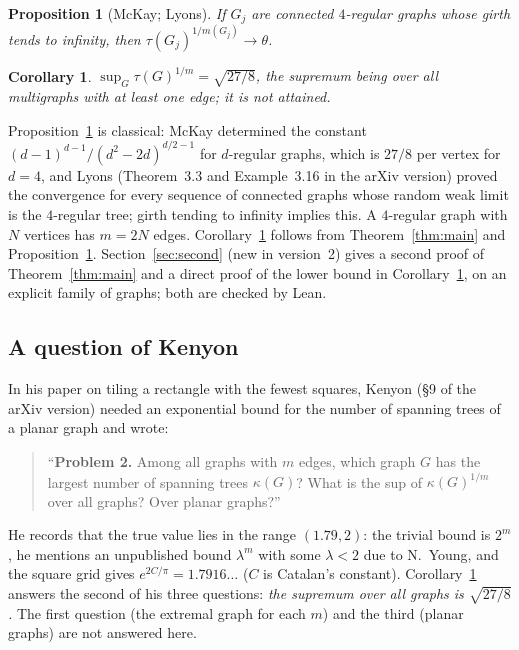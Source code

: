 \documentclass[11pt]{amsart}
\theoremstyle{plain}
\newtheorem{proposition}[theorem]{Proposition}
\newtheorem{corollary}[theorem]{Corollary}
\theoremstyle{remark}
\newcommand{\tht}{\theta}
\begin{document}
\begin{proposition}[McKay; Lyons]\label{prop:sharp}
If $G_j$ are connected $4$-regular graphs whose girth tends to infinity, then $\tau(G_j)^{1/m(G_j)}\to\tht$.
\end{proposition}

\begin{corollary}\label{cor:sup}
$\sup_G\tau(G)^{1/m}=\sqrt{27/8}$, the supremum being over all multigraphs with at least one edge; it is not attained.
\end{corollary}

Proposition~\ref{prop:sharp} is classical: McKay \cite{McKay} determined the constant $(d-1)^{d-1}/(d^2-2d)^{d/2-1}$
for $d$-regular graphs, which is $27/8$ per vertex for $d=4$, and Lyons \cite{Lyons} (Theorem~3.3 and
Example~3.16 in the arXiv version) proved the convergence for every sequence of connected graphs whose random weak
limit is the $4$-regular tree; girth tending to infinity implies this. A $4$-regular graph with $N$ vertices has
$m=2N$ edges. Corollary~\ref{cor:sup} follows from Theorem~\ref{thm:main} and Proposition~\ref{prop:sharp}.
Section~\ref{sec:second} (new in version~2) gives a second proof of Theorem~\ref{thm:main} and a direct proof of the
lower bound in Corollary~\ref{cor:sup}, on an explicit family of graphs; both are checked by Lean.

\subsection*{A question of Kenyon}
In his paper on tiling a rectangle with the fewest squares, Kenyon \cite{Kenyon} (\S9 of the arXiv version) needed
an exponential bound
for the number of spanning trees of a planar graph and wrote:
\begin{quote}
``\textbf{Problem 2.} Among all graphs with $m$ edges, which graph $G$ has the largest number of spanning trees
$\kappa(G)$? What is the sup of $\kappa(G)^{1/m}$ over all graphs? Over planar graphs?''
\end{quote}
He records that the true value lies in the range $(1.79,2)$: the trivial bound is $2^m$, he mentions an unpublished
bound $\lambda^m$ with some $\lambda<2$ due to N.~Young, and the square grid gives $e^{2C/\pi}=1.7916\ldots$ ($C$ is
Catalan's constant). Corollary~\ref{cor:sup} answers the second of his three questions: \emph{the supremum over
all graphs is $\sqrt{27/8}$.} The first question (the extremal graph for each $m$) and the third (planar graphs) are not
answered here.
\end{document}
